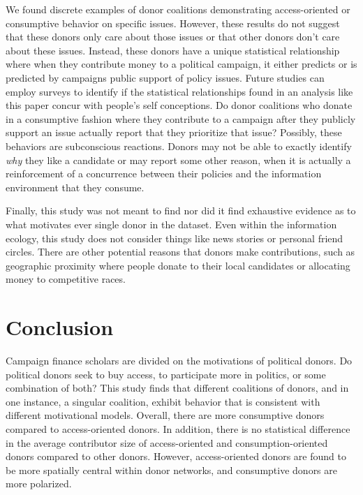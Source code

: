 \documentclass[12pt,]{article}
\begin{document}
We found discrete examples of donor coalitions demonstrating
access-oriented or consumptive behavior on specific issues. However,
these results do not suggest that these donors only care about those
issues or that other donors don't care about these issues. Instead,
these donors have a unique statistical relationship where when they
contribute money to a political campaign, it either predicts or is
predicted by campaigns public support of policy issues. Future studies
can employ surveys to identify if the statistical relationships found in
an analysis like this paper concur with people's self conceptions. Do
donor coalitions who donate in a consumptive fashion where they
contribute to a campaign after they publicly support an issue actually
report that they prioritize that issue? Possibly, these behaviors are
subconscious reactions. Donors may not be able to exactly identify
\emph{why} they like a candidate or may report some other reason, when
it is actually a reinforcement of a concurrence between their policies
and the information environment that they consume.

Finally, this study was not meant to find nor did it find exhaustive
evidence as to what motivates ever single donor in the dataset. Even
within the information ecology, this study does not consider things like
news stories or personal friend circles. There are other potential
reasons that donors make contributions, such as geographic proximity
where people donate to their local candidates or allocating money to
competitive races.

\hypertarget{conclusion}{%
\section{Conclusion}\label{conclusion}}

Campaign finance scholars are divided on the motivations of political
donors. Do political donors seek to buy access, to participate more in
politics, or some combination of both? This study finds that different
coalitions of donors, and in one instance, a singular coalition, exhibit
behavior that is consistent with different motivational models. Overall,
there are more consumptive donors compared to access-oriented donors. In
addition, there is no statistical difference in the average contributor
size of access-oriented and consumption-oriented donors compared to
other donors. However, access-oriented donors are found to be more
spatially central within donor networks, and consumptive donors are more
polarized.
\end{document}
